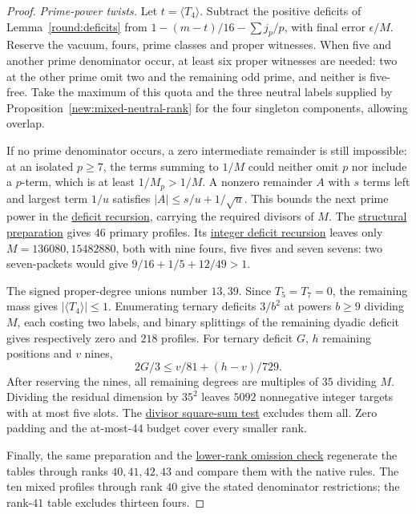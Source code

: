 \documentclass[11pt]{amsart}
\numberwithin{equation}{section}
\theoremstyle{definition}
\theoremstyle{plain}
\newcommand{\supfile}[2]{\href{run:rank-bound-supplement/#1}{#2}}
\begin{document}
\begin{proof}
\emph{Prime-power twists.}
Let $t=\langle T_4\rangle$. Subtract the positive deficits of
Lemma~\ref{round:deficits} from $1-(m-t)/16-\sum j_p/p$, with final
error $\epsilon/M$. Reserve the vacuum, fours, prime classes and
proper witnesses. When five and another prime denominator occur,
at least six proper witnesses are needed: two at the other prime
omit two and the remaining odd prime, and neither is five-free.
Take the maximum of this quota and the three neutral labels supplied
by Proposition~\ref{new:mixed-neutral-rank} for the four singleton
components, allowing overlap.

If no prime denominator occurs, a zero intermediate remainder is
still impossible: at an isolated $p\ge7$, the terms summing to
$1/M$ could neither omit $p$ nor include a $p$-term, which is at
least $1/M_p>1/M$. A nonzero remainder $A$ with $s$ terms left
and largest term $1/u$ satisfies $|A|\le s/u+1/\sqrt u$.
This bounds the next prime power in the
\supfile{arithmetic/phase_deficits.py}{deficit recursion}, carrying
the required divisors of $M$.
The \supfile{census/preflight.py}{structural preparation} gives
$46$ primary profiles. Its
\supfile{census/arithmetic/int_deficits.py}{integer deficit recursion}
leaves only $M=136080,15482880$, both with nine fours, five fives
and seven sevens: two seven-packets would give
$9/16+1/5+12/49>1$.

The signed proper-degree unions number $13,39$. Since $T_5=T_7=0$,
the remaining mass gives $|\langle T_4\rangle|\le1$.
Enumerating ternary deficits $3/b^2$ at powers $b\ge9$ dividing
$M$, each costing two labels, and binary splittings of the remaining
dyadic deficit gives respectively zero and $218$ profiles.
For ternary deficit $G$, $h$ remaining positions and $v$ nines,
\[
                    2G/3\le v/81+(h-v)/729.
\]
After reserving the nines, all remaining degrees are multiples of
$35$ dividing $M$. Dividing the residual dimension by $35^2$ leaves
$5092$ nonnegative integer targets with at most five slots.
The \supfile{census/arithmetic/gauss_divisors.py}{divisor square-sum test}
excludes them all. Zero padding and the at-most-$44$ budget cover
every smaller rank.

Finally, the same preparation and the
\supfile{arithmetic/frontier_cases.py}{lower-rank omission check}
regenerate the tables through ranks $40,41,42,43$ and compare them
with the native rules. The ten mixed profiles through rank $40$
give the stated denominator restrictions; the rank-$41$ table
excludes thirteen fours.
\end{proof}
\end{document}
